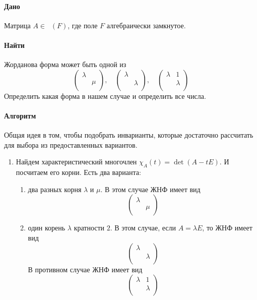\documentclass{article}
\newcommand{\Matrix}[2]{\mathop{\mathrm{M}_{#2}}(#1)}
\begin{document}
\paragraph{Дано} Матрица $A\in \Matrix{F}{2}$, где поле $F$ алгебраически замкнутое.

\paragraph{Найти} Жорданова форма может быть одной из
\[
\begin{pmatrix}
{\lambda}&{}\\
{}&{\mu}\\
\end{pmatrix}
,\quad
\begin{pmatrix}
{\lambda}&{}\\
{}&{\lambda}\\
\end{pmatrix}
,\quad
\begin{pmatrix}
{\lambda}&{1}\\
{}&{\lambda}\\
\end{pmatrix}
\]
Определить какая форма в нашем случае и определить все числа.

\paragraph{Алгоритм}
Общая идея в том, чтобы подобрать инварианты, которые достаточно рассчитать для выбора из предоставленных вариантов.
\begin{enumerate}
\item Найдем характеристический многочлен $\chi_A(t) =\det(A - t E)$. И посчитаем его корни. Есть два варианта: 
\begin{enumerate}
\item два разных корня $\lambda$ и $\mu$. В этом случае ЖНФ имеет вид
\[
\begin{pmatrix}
{\lambda}&{}\\
{}&{\mu}\\
\end{pmatrix}
\]

\item один корень $\lambda$ кратности $2$. В этом случае, если $A = \lambda E$, то ЖНФ имеет вид
\[
\begin{pmatrix}
{\lambda}&{}\\
{}&{\lambda}\\
\end{pmatrix}
\]
В противном случае ЖНФ имеет вид
\[
\begin{pmatrix}
{\lambda}&{1}\\
{}&{\lambda}\\
\end{pmatrix}
\]
\end{enumerate}
\end{enumerate}
\end{document}
